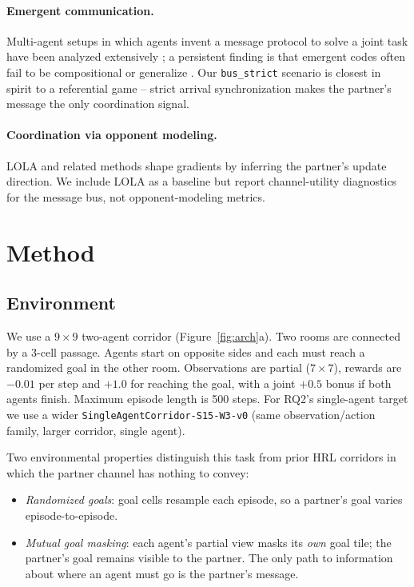 \documentclass{article}
\begin{document}
\paragraph{Emergent communication.} Multi-agent setups in which agents
invent a message protocol to solve a joint task have been analyzed
extensively \citep{lowe2017maddpg,chaabouni2020compositionality}; a
persistent finding is that emergent codes often fail to be compositional
or generalize \citep{chaabouni2020compositionality}. Our \texttt{bus\_strict}
scenario is closest in spirit to a referential game -- strict arrival
synchronization makes the partner's message the only coordination signal.

\paragraph{Coordination via opponent modeling.} LOLA \citep{foerster2018lola}
and related methods shape gradients by inferring the partner's update
direction. We include LOLA as a baseline but report channel-utility
diagnostics for the message bus, not opponent-modeling metrics.

\section{Method}
\label{sec:method}

\subsection{Environment}

We use a $9 \times 9$ two-agent corridor (Figure~\ref{fig:arch}a). Two
rooms are connected by a 3-cell passage. Agents start on opposite sides
and each must reach a randomized goal in the other room. Observations are
partial ($7 \times 7$), rewards are $-0.01$ per step and $+1.0$ for
reaching the goal, with a joint $+0.5$ bonus if both agents finish. Maximum
episode length is 500 steps. For RQ2's single-agent target we use a wider
\texttt{SingleAgentCorridor-S15-W3-v0} (same observation/action family,
larger corridor, single agent).

Two environmental properties distinguish this task from prior HRL corridors
in which the partner channel has nothing to convey:

\begin{itemize}[nosep,leftmargin=*]
\item \emph{Randomized goals}: goal cells resample each episode, so a
partner's goal varies episode-to-episode.
\item \emph{Mutual goal masking}: each agent's partial view masks its
\emph{own} goal tile; the partner's goal remains visible to the partner.
The only path to information about where an agent must go is the
partner's message.
\end{itemize}
\end{document}
